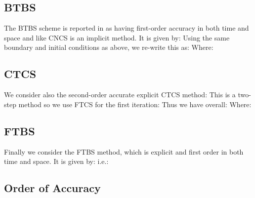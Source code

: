 \documentclass[10pt]{article}
\begin{document}
\subsection{BTBS}

The BTBS scheme is reported in \cite{MPE} as having first-order accuracy in both time and space and like CNCS is an implicit method. It is given by:
Using the same boundary and initial conditions as above, we re-write this as:
Where:

\subsection{CTCS}

We consider also the second-order accurate explicit CTCS method:
This is a two-step method so we use FTCS for the first iteration:
Thus we have overall:
Where:

\subsection{FTBS}

Finally we consider the FTBS method, which is explicit and first order in both time and space. It is given by:
i.e.:

\subsection{Order of Accuracy}
\end{document}
